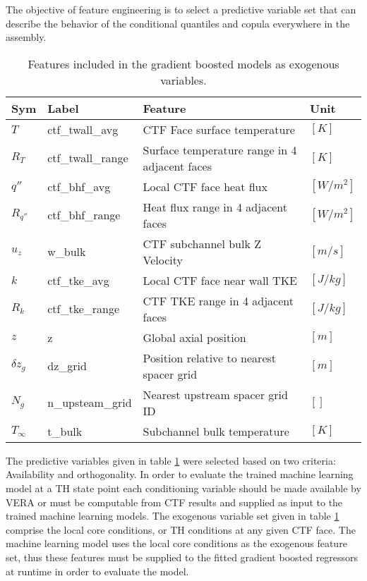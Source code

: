 The objective of feature engineering is to select a predictive variable set that can describe the behavior of the conditional quantiles and copula everywhere in the assembly.

\begin{table}[h]
    \begin{center}
    \caption[Included exogenous training features.]{Features included in the gradient boosted models as exogenous variables.}
\begin{tabular}[h]{|l | l | l | l |}
    \hline
    Sym & Label & Feature & Unit \\
    \hline
    \hline
    $T$ & ctf\_twall\_avg & CTF Face surface temperature & $[K]$ \\
    $R_T$ & ctf\_twall\_range & Surface temperature range in 4 adjacent faces & $[K]$ \\
    $q''$ & ctf\_bhf\_avg & Local CTF face heat flux & $[W/m^2]$ \\
    $R_{q''}$ & ctf\_bhf\_range & Heat flux range in 4 adjacent faces & $[W/m^2]$ \\
    $u_z$ & w\_bulk & CTF subchannel bulk Z Velocity &  $[m/s]$ \\
    $k$ & ctf\_tke\_avg & Local CTF face near wall TKE &  $[J/kg]$ \\
    $R_k$ & ctf\_tke\_range & CTF TKE range in 4 adjacent faces & $[J/kg]$ \\
    $z$ & z & Global axial position & $[m]$ \\
    $\delta z_g$ & dz\_grid & Position relative to nearest spacer grid & $[m]$ \\
    $N_g$ & n\_upsteam\_grid  & Nearest upstream spacer grid ID & $[]$ \\
    $T_\infty$ & t\_bulk & Subchannel bulk temperature  &  $[K]$ \\
    \hline
\end{tabular}
\label{tab:features}
\end{center}
\end{table}

The predictive variables given in table \ref{tab:features} were selected based on two criteria:  Availability and orthogonality.  In order to evaluate the trained machine learning model at a TH state point each conditioning variable should be made available by VERA or must be computable from CTF results and supplied as input to the trained machine learning models.   The exogenous variable set given in table \ref{tab:features} comprise the local core conditions, or TH conditions at any given CTF face.  The machine learning model uses the local core conditions as the exogenous feature set, thus these features must be supplied to the fitted gradient boosted regressors at runtime in order to evaluate the model.

